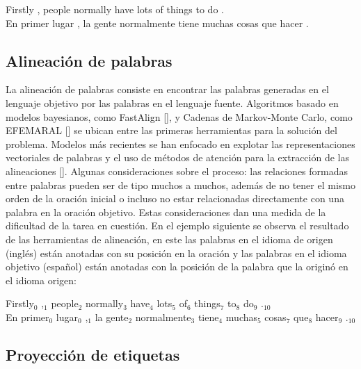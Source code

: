 \begin{adjustwidth}{25pt}{25pt}
	Firstly , people normally have lots of things to do . \\
	En primer lugar , la gente normalmente tiene muchas cosas que hacer .
\end{adjustwidth}

\subsection{Alineación de palabras}

La alineación de palabras consiste en encontrar las palabras generadas en el lenguaje objetivo por las 
palabras en el lenguaje fuente.
Algoritmos basado en modelos bayesianos, como FastAlign [\cite{dyer2013fastalign}], 
y Cadenas de Markov-Monte Carlo, como EFEMARAL [\cite{ostling2016efficient}] se ubican entre
las primeras herramientas para la solución del problema. 
Modelos más recientes se han enfocado en explotar las representaciones
vectoriales de palabras y el uso de métodos de atención para la extracción de las
alineaciones [\cite{dou2021word}]. Algunas consideraciones sobre el proceso: las relaciones 
formadas entre palabras pueden ser de tipo muchos a muchos, además de no tener el mismo orden de la 
oración inicial o incluso no estar relacionadas directamente con una palabra en la oración objetivo.
Estas consideraciones dan una medida de la dificultad de la tarea en cuestión.
En el ejemplo siguiente se observa el resultado de las herramientas de alineación, en este 
las palabras en el idioma de origen (inglés) están anotadas con su posición en la oración y 
las palabras en el idioma objetivo (español) están anotadas con la posición de la palabra que 
la originó en el idioma origen:

\begin{adjustwidth}{25pt}{25pt}
	Firstly$_0$ ,$_1$ people$_2$ normally$_3$ have$_4$ lots$_5$ of$_6$ things$_7$ to$_8$ do$_9$ .$_{10}$ \\
	En primer$_0$ lugar$_0$ ,$_1$ la gente$_2$ normalmente$_3$ tiene$_4$ muchas$_5$ cosas$_7$ que$_8$ hacer$_9$ .$_{10}$
\end{adjustwidth}

\subsection{Proyección de etiquetas}

